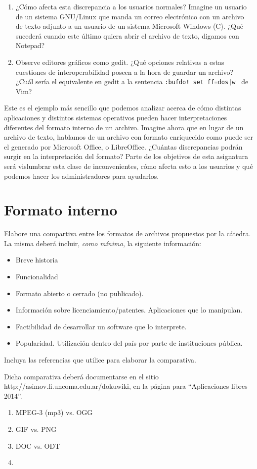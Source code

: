 \documentclass[12pt]{article}
\begin{document}
\begin{enumerate}
	\item ¿Cómo afecta esta discrepancia a los usuarios normales? Imagine un usuario de un 
	sistema GNU/Linux que manda un correo electrónico con un archivo de texto adjunto a un usuario de un 
	sistema Microsoft Windows (C). ¿Qué sucederá cuando este último quiera abrir el archivo 
	de texto, digamos con Notepad?
	\item Observe editores gráficos como gedit. ¿Qué opciones relativas a estas cuestiones de 
	interoperabilidad poseen a la hora de guardar un archivo? ¿Cuál sería el equivalente en  
	gedit a la sentencia {\tt :bufdo! set ff=dos|w } de Vim? 
\end{enumerate}
     
Este es el ejemplo más sencillo que podemos analizar acerca de cómo distintas aplicaciones y 
distintos sistemas operativos pueden hacer interpretaciones diferentes del formato interno de 
un archivo. Imagine ahora que en lugar de un archivo de texto, hablamos de un archivo con 
formato enriquecido como puede ser el generado por Microsoft Office, o LibreOffice. ¿Cuántas
discrepancias podrán surgir en la interpretación del formato? Parte de los objetivos de 
esta asignatura será vislumbrar esta clase de inconvenientes, cómo afecta esto a los usuarios y
qué podemos hacer los administradores para ayudarlos. 

\section*{Formato interno}

Elabore una compartiva entre los formatos de archivos propuestos por la 
cátedra. La misma deberá incluir, {\it como mínimo}, la siguiente información:
\begin{itemize} 
\item Breve historia
\item Funcionalidad
\item Formato abierto o cerrado (no publicado).
\item Información sobre licenciamiento/patentes.
\ITEM Aplicaciones que lo manipulan. 
\item Factibilidad de desarrollar un software que lo interprete. 
\item Popularidad. Utilización dentro del país por parte de instituciones pública.  
\end{itemize} 
Incluya las referencias que utilice para elaborar la comparativa. 

Dicha comparativa deberá documentarse en el sitio 
http://asimov.fi.uncoma.edu.ar/dokuwiki, en la página 
para ``Aplicaciones libres 2014''. 

\begin{enumerate}
\item MPEG-3 (mp3) vs. OGG
\item GIF vs. PNG 
\item DOC vs. ODT
\item 
\end{enumerate}
 
\end{document}
